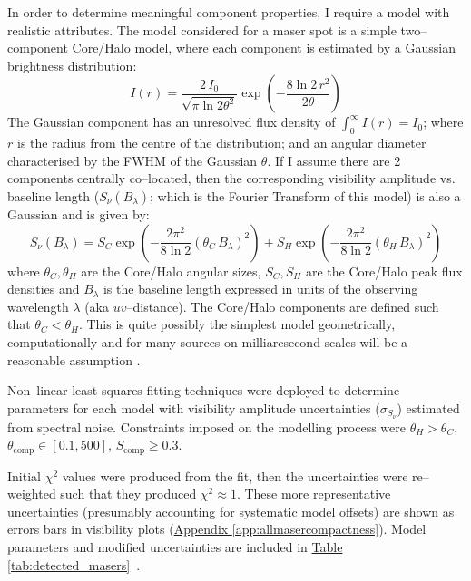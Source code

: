         In order to determine meaningful component properties, I require a model with realistic attributes. The model considered for a maser spot is a simple two--component Core/Halo model, where each component is estimated by a Gaussian brightness distribution:
        \begin{equation}
            I(r) =  \frac{2\,I_0}{\sqrt{\pi\ln 2\theta^2}} \exp\left( -\frac{8\ln 2\,r^2}{2\theta} \right)
        \end{equation}
        The Gaussian component has an unresolved flux density of $\int_{0}^{\infty}I(r)=I_0$; where $r$ is the radius from the centre of the distribution; and an angular diameter characterised by the FWHM of the Gaussian $\theta$. If I assume there are 2 components centrally co--located, then the corresponding visibility amplitude vs. baseline length ($S_\nu(B_\lambda)$; which is the Fourier Transform of this model) is also a Gaussian and is given by:
        \begin{equation}
            S_\nu(B_\lambda) =  S_C\exp\left( {-\frac{2\pi^2}{8\ln 2}(\theta_C\,B_\lambda)^2} \right) + S_H\exp\left( {-\frac{2\pi^2}{8\ln 2}(\theta_H\,B_\lambda)^2} \right)
        \end{equation}
        where $\theta_C,\theta_H$ are the Core/Halo angular sizes, $S_C,S_H$ are the Core/Halo peak flux densities and $B_\lambda$ is the baseline length expressed in units of the observing wavelength $\lambda$ (aka $uv$--distance). The Core/Halo components are defined such that $\theta_C<\theta_H$. This is quite possibly the simplest model geometrically, computationally and for many sources on milliarcsecond scales will be a reasonable assumption \citep{Minier2002}.
        
        Non--linear least squares fitting techniques were deployed to determine parameters for each model with visibility amplitude uncertainties ($\sigma_{S_\nu}$) estimated from spectral noise. Constraints imposed on the modelling process were $\theta_H>\theta_C$, $\theta_\text{comp}\in[0.1,500]$, $S_\text{comp}\ge0.3$.
  
        Initial $\chi^2$ values were produced from the fit, then the uncertainties were re--weighted such that they produced $\chi^2\approx1$. These more representative uncertainties (presumably accounting for systematic model offsets) are shown as errors bars in visibility plots (\hyperref[app:allmasercompactness]{Appendix \ref*{app:allmasercompactness}}). Model parameters and modified uncertainties are included in \hyperref[tab:detected_masers]{Table \ref*{tab:detected_masers}}~.
        
